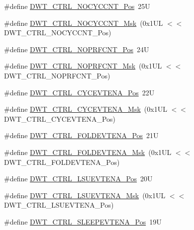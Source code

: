 \begin{DoxyCompactItemize}
\item 
\#define \hyperlink{group___c_m_s_i_s___d_w_t_ga337f6167d960f57f12aa382ffecce522}{D\-W\-T\-\_\-\-C\-T\-R\-L\-\_\-\-N\-O\-C\-Y\-C\-C\-N\-T\-\_\-\-Pos}~25\-U
\item 
\#define \hyperlink{group___c_m_s_i_s___d_w_t_gaf40c8d7a4fd978034c137e90f714c143}{D\-W\-T\-\_\-\-C\-T\-R\-L\-\_\-\-N\-O\-C\-Y\-C\-C\-N\-T\-\_\-\-Msk}~(0x1\-U\-L $<$$<$ D\-W\-T\-\_\-\-C\-T\-R\-L\-\_\-\-N\-O\-C\-Y\-C\-C\-N\-T\-\_\-\-Pos)
\item 
\#define \hyperlink{group___c_m_s_i_s___d_w_t_gad52a0e5be84363ab166cc17beca0d048}{D\-W\-T\-\_\-\-C\-T\-R\-L\-\_\-\-N\-O\-P\-R\-F\-C\-N\-T\-\_\-\-Pos}~24\-U
\item 
\#define \hyperlink{group___c_m_s_i_s___d_w_t_gafd8448d7db4bc51f27f202e6e1f27823}{D\-W\-T\-\_\-\-C\-T\-R\-L\-\_\-\-N\-O\-P\-R\-F\-C\-N\-T\-\_\-\-Msk}~(0x1\-U\-L $<$$<$ D\-W\-T\-\_\-\-C\-T\-R\-L\-\_\-\-N\-O\-P\-R\-F\-C\-N\-T\-\_\-\-Pos)
\item 
\#define \hyperlink{group___c_m_s_i_s___d_w_t_ga0cb0640aaeb18a626d7823570d5c3cb6}{D\-W\-T\-\_\-\-C\-T\-R\-L\-\_\-\-C\-Y\-C\-E\-V\-T\-E\-N\-A\-\_\-\-Pos}~22\-U
\item 
\#define \hyperlink{group___c_m_s_i_s___d_w_t_ga40554bd81460e39abf08810f45fac1a2}{D\-W\-T\-\_\-\-C\-T\-R\-L\-\_\-\-C\-Y\-C\-E\-V\-T\-E\-N\-A\-\_\-\-Msk}~(0x1\-U\-L $<$$<$ D\-W\-T\-\_\-\-C\-T\-R\-L\-\_\-\-C\-Y\-C\-E\-V\-T\-E\-N\-A\-\_\-\-Pos)
\item 
\#define \hyperlink{group___c_m_s_i_s___d_w_t_ga5602b0707f446ce78d88ff2a3a82bfff}{D\-W\-T\-\_\-\-C\-T\-R\-L\-\_\-\-F\-O\-L\-D\-E\-V\-T\-E\-N\-A\-\_\-\-Pos}~21\-U
\item 
\#define \hyperlink{group___c_m_s_i_s___d_w_t_ga717e679d775562ae09185a3776b1582f}{D\-W\-T\-\_\-\-C\-T\-R\-L\-\_\-\-F\-O\-L\-D\-E\-V\-T\-E\-N\-A\-\_\-\-Msk}~(0x1\-U\-L $<$$<$ D\-W\-T\-\_\-\-C\-T\-R\-L\-\_\-\-F\-O\-L\-D\-E\-V\-T\-E\-N\-A\-\_\-\-Pos)
\item 
\#define \hyperlink{group___c_m_s_i_s___d_w_t_gaea5d1ee72188dc1d57b54c60a9f5233e}{D\-W\-T\-\_\-\-C\-T\-R\-L\-\_\-\-L\-S\-U\-E\-V\-T\-E\-N\-A\-\_\-\-Pos}~20\-U
\item 
\#define \hyperlink{group___c_m_s_i_s___d_w_t_gac47427f455fbc29d4b6f8a479169f2b2}{D\-W\-T\-\_\-\-C\-T\-R\-L\-\_\-\-L\-S\-U\-E\-V\-T\-E\-N\-A\-\_\-\-Msk}~(0x1\-U\-L $<$$<$ D\-W\-T\-\_\-\-C\-T\-R\-L\-\_\-\-L\-S\-U\-E\-V\-T\-E\-N\-A\-\_\-\-Pos)
\item 
\#define \hyperlink{group___c_m_s_i_s___d_w_t_ga9c6d62d121164013a8e3ee372f17f3e5}{D\-W\-T\-\_\-\-C\-T\-R\-L\-\_\-\-S\-L\-E\-E\-P\-E\-V\-T\-E\-N\-A\-\_\-\-Pos}~19\-U
$$
\end{DoxyCompactItemize}
